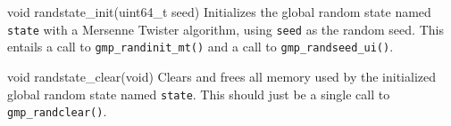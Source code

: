 \begin{funcdoc}{void randstate\_init(uint64\_t seed)}
  Initializes the global random state named \texttt{state} with a
  Mersenne Twister algorithm, using \texttt{seed} as the random seed.
  This entails a call to \texttt{gmp\_randinit\_mt()} and a call to
  \texttt{gmp\_randseed\_ui()}.
\end{funcdoc}

\begin{funcdoc}{void randstate\_clear(void)}
  Clears and frees all memory used by the initialized global random
  state named \texttt{state}. This should just be a single call to
  \texttt{gmp\_randclear()}.
\end{funcdoc}
